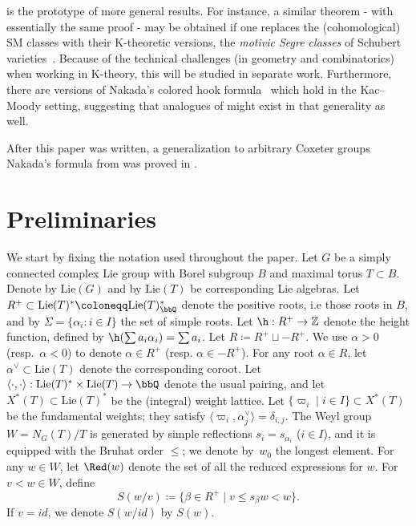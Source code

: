  is the prototype of more general results. For instance,
a similar theorem - with essentially the same proof - may be obtained if one replaces the (cohomological) SM classes
with their K-theoretic versions, the {\em motivic Segre classes} of Schubert varieties~\cite{AMSS:motivic,mihalcea2020left}.
Because of the
technical challenges (in geometry and combinatorics) when working in K-theory, this will be studied
in separate work. Furthermore, there are versions of
Nakada's colored hook formula~\cite{nakada:colored} which hold in the Kac--Moody setting, 
suggesting that analogues of  
 might exist in that generality as well.\begin{footnote} 
{After this paper was written, a generalization to arbitrary Coxeter groups Nakada's formula from  was proved in
\cite{MNS24Coxeterhook}.}\end{footnote}


\section{Preliminaries}\label{sec:prelims}
We start by fixing the notation used throughout the paper. Let $G$ be a simply connected complex 
Lie group with Borel subgroup $B$ and maximal torus $T\subset B$. Denote by 
$\mathrm{Lie}(G)$ and by 
$\mathrm{Lie}(T)$ 
be corresponding Lie algebras. Let 
$R^+\subset \mathrm{Lie}(T)^*\coloneqq \mathrm{Lie}(T)^*_\bbQ$
denote the positive roots, 
i.e those roots in $B$, and by $\Sigma =\{ \alpha_i: i \in I \}$ the set of simple roots. Let 
$\h: R^+ \to \mathbb{Z}$ 
denote the height function, defined by $\h(\sum a_i \alpha_i) = \sum a_i$. Let $R\coloneqq R^+\sqcup -R^+$. 
We use $\alpha>0$ (resp.~$\alpha<0$) to denote $\alpha\in R^+$ (resp. $\alpha\in -R^+$). For any 
root $\alpha\in R$, let 
$\alpha^\vee \subset \mathrm{Lie}(T)$
denote the corresponding coroot. Let~$\langle \cdot,\cdot \rangle: \mathrm{Lie}(T)^{*}\times \mathrm{Lie}(T)\to \bbQ$
denote the usual pairing, and let 
$X^*(T)\subset \mathrm{Lie}(T)^*$ 
be the (integral) weight lattice. 
Let $\{\varpi_i\mid i\in I\}\subset X^*(T)$ be the fundamental weights; they satisfy $\langle \varpi_i, \alpha_j^\vee \rangle = \delta_{i,j}$.
The Weyl group $W = N_G(T)/T$ is generated by simple reflections $s_i= s_{\alpha_i}$ ($i \in I$), and it is equipped with 
the Bruhat order $\leq$; we denote by~$w_0$ the longest element. For any $w\in W$, let $\Red(w)$ 
denote the set of all the reduced expressions for $w$. For $v < w \in W$, define 
\begin{equation}\label{equ:wvinversion}
	S(w/v)\coloneqq \{\beta\in R^+\mid v\le s_\beta w<w\}.
\end{equation}
If $v=id$, we denote $S(w/id)$ by $S(w)$.

